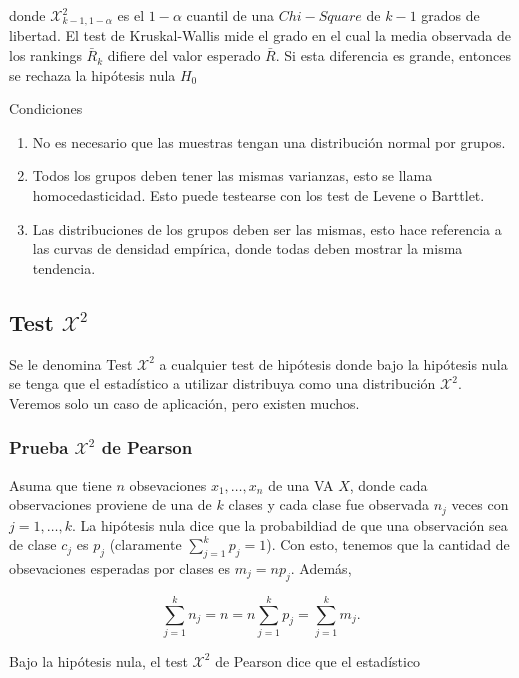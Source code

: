 donde $\mathcal{X}^2_{k-1, 1-\alpha}$ es el $1-\alpha$ cuantil de una $Chi-Square$ de $k-1$ grados de libertad. El test de Kruskal-Wallis mide el grado en el cual la media observada de los rankings $\bar{R}_k$ difiere del valor esperado $\bar{R}$. Si esta diferencia es grande, entonces se rechaza la hipótesis nula $H_0$

Condiciones

\begin{enumerate}
    \item No es necesario que las muestras tengan una distribución normal por grupos.
    \item Todos los grupos deben tener las mismas varianzas, esto se llama homocedasticidad. Esto puede testearse con los test de Levene o Barttlet.
    \item Las distribuciones de los grupos deben ser las mismas, esto hace referencia a las curvas de densidad empírica, donde todas deben mostrar la misma tendencia. 
\end{enumerate}




\subsection{Test $\mathcal{X}^2$} 

Se le denomina Test $\mathcal{X}^2$  a cualquier test de hipótesis donde bajo la hipótesis nula se tenga que el estadístico a utilizar distribuya como una distribución $\mathcal{X}^2$. Veremos solo un caso de aplicación, pero existen muchos.

\subsubsection{Prueba $\mathcal{X}^2$ de Pearson}

Asuma que tiene $n$ obsevaciones $x_1,\ldots,x_n$ de una VA $X$, donde cada observaciones proviene de una de $k$ clases y cada clase fue observada $n_j$ veces con $j=1,\ldots,k$. La hipótesis nula dice que la probabildiad de que una observación sea de clase $c_j$ es $p_j$ (claramente $\sum_{j=1}^kp_j=1$). Con esto, tenemos que la cantidad de obsevaciones esperadas por clases es $m_j = np_j$. Además, 

\begin{equation}
	  	\sum_{j=1}^k n_j = n  = n \sum_{j=1}^k p_j = \sum_{j=1}^k m_j.
  \end{equation}  


Bajo la hipótesis nula, el test $\mathcal{X}^2$ de Pearson dice que el estadístico


